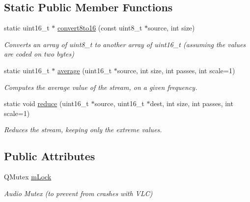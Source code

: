 \subsection*{Static Public Member Functions}
\begin{DoxyCompactItemize}
\item 
\hypertarget{classStreamPlayer_a6950378c20017d855c1509fab94fb83b}{
static uint16\_\-t $\ast$ \hyperlink{classStreamPlayer_a6950378c20017d855c1509fab94fb83b}{convert8to16} (const uint8\_\-t $\ast$source, int size)}
\label{classStreamPlayer_a6950378c20017d855c1509fab94fb83b}

\begin{DoxyCompactList}\small\item\em Converts an array of uint8\_\-t to another array of uint16\_\-t (assuming the values are coded on two bytes) \item\end{DoxyCompactList}\item 
\hypertarget{classStreamPlayer_aab13a8e6a6ba72c1582f7b4961c5e32f}{
static uint16\_\-t $\ast$ \hyperlink{classStreamPlayer_aab13a8e6a6ba72c1582f7b4961c5e32f}{average} (uint16\_\-t $\ast$source, int size, int passes, int scale=1)}
\label{classStreamPlayer_aab13a8e6a6ba72c1582f7b4961c5e32f}

\begin{DoxyCompactList}\small\item\em Computes the average value of the stream, on a given frequency. \item\end{DoxyCompactList}\item 
\hypertarget{classStreamPlayer_a322295d86c497e9c2fb8ad93a8299644}{
static void \hyperlink{classStreamPlayer_a322295d86c497e9c2fb8ad93a8299644}{reduce} (uint16\_\-t $\ast$source, uint16\_\-t $\ast$dest, int size, int passes, int scale=1)}
\label{classStreamPlayer_a322295d86c497e9c2fb8ad93a8299644}

\begin{DoxyCompactList}\small\item\em Reduces the stream, keeping only the extreme values. \item\end{DoxyCompactList}\end{DoxyCompactItemize}
\subsection*{Public Attributes}
\begin{DoxyCompactItemize}
\item 
\hypertarget{classStreamPlayer_a11f1b6749c5fb8b1028d548a4e02eb2c}{
QMutex \hyperlink{classStreamPlayer_a11f1b6749c5fb8b1028d548a4e02eb2c}{mLock}}
\label{classStreamPlayer_a11f1b6749c5fb8b1028d548a4e02eb2c}

\begin{DoxyCompactList}\small\item\em Audio Mutex (to prevent from crashes with VLC) \item\end{DoxyCompactList}\end{DoxyCompactItemize}


